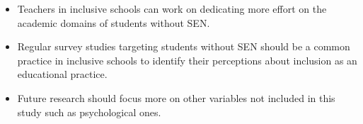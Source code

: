 \documentclass[10pt]{NSP1}
\begin{document}
\par\medskip{}\smallskip

\begin{itemize}
  \item Teachers in inclusive schools can work on dedicating more effort on the academic domains of students without SEN.
  \item Regular survey studies targeting students without SEN should be a common practice in inclusive schools to identify their perceptions about inclusion as an educational practice.
  \item Future research should focus more on other variables not included in this study such as psychological ones.
\end{itemize}
\end{document}
